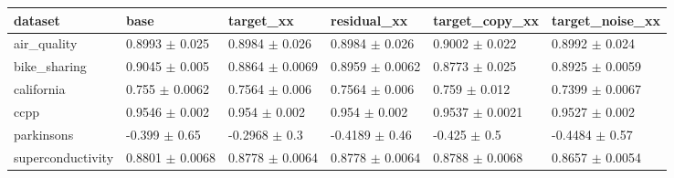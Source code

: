 \begin{tabular}{llllll}
\toprule
dataset & base & target\_xx & residual\_xx & target\_copy\_xx & target\_noise\_xx \\
\midrule
air\_quality & 0.8993 $\pm$ 0.025 & 0.8984 $\pm$ 0.026 & 0.8984 $\pm$ 0.026 & 0.9002 $\pm$ 0.022 & 0.8992 $\pm$ 0.024 \\
bike\_sharing & 0.9045 $\pm$ 0.005 & 0.8864 $\pm$ 0.0069 & 0.8959 $\pm$ 0.0062 & 0.8773 $\pm$ 0.025 & 0.8925 $\pm$ 0.0059 \\
california & 0.755 $\pm$ 0.0062 & 0.7564 $\pm$ 0.006 & 0.7564 $\pm$ 0.006 & 0.759 $\pm$ 0.012 & 0.7399 $\pm$ 0.0067 \\
ccpp & 0.9546 $\pm$ 0.002 & 0.954 $\pm$ 0.002 & 0.954 $\pm$ 0.002 & 0.9537 $\pm$ 0.0021 & 0.9527 $\pm$ 0.002 \\
parkinsons & -0.399 $\pm$ 0.65 & -0.2968 $\pm$ 0.3 & -0.4189 $\pm$ 0.46 & -0.425 $\pm$ 0.5 & -0.4484 $\pm$ 0.57 \\
superconductivity & 0.8801 $\pm$ 0.0068 & 0.8778 $\pm$ 0.0064 & 0.8778 $\pm$ 0.0064 & 0.8788 $\pm$ 0.0068 & 0.8657 $\pm$ 0.0054 \\
\bottomrule
\end{tabular}
